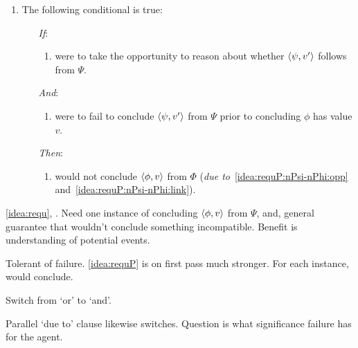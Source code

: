 \begin{note}
\begin{definition}[A \requP{0}]
\begin{itemize}
      \begin{enumerate}[label=\arabic*., ref=\named{R:\arabic*}, resume]
      \item
        \label{idea:requP:nPsi-nPhi}
        The following conditional is true:
        \begin{enumerate}
        \item[\emph{If}:]
          \begin{enumerate}[label=\alph*., ref=\named{R:2\alph*}]
          \item
            \label{idea:requP:nPsi-nPhi:opp}
            \vAgent{} were to take the opportunity to reason about whether \(\langle \psi, v' \rangle\) follows from \(\Psi\).
          \end{enumerate}
        \item[\emph{And}:]
          \begin{enumerate}[label=\alph*., ref=\named{R:2\alph*}, resume]
          \item
            \label{idea:requP:nPsi-nPhi:link}
            \vAgent{} were to fail to conclude \(\langle \psi, v' \rangle\) from \(\Psi\) prior to concluding \(\phi\) has value \(v\).
          \end{enumerate}
        \item[\emph{Then}:]
          \begin{enumerate}[label=\alph*., ref=\named{R:2\alph*}, resume]
            \label{idea:requP:nPsi-nPhi:fail}
          \item
            \vAgent{} would not conclude \(\langle \phi, v \rangle\) from \(\Phi\) (\emph{due to}~\ref{idea:requP:nPsi-nPhi:opp} and~\ref{idea:requP:nPsi-nPhi:link}).
          \end{enumerate}
        \end{enumerate}
      \end{enumerate}
    \end{itemize}
    \vspace{-\baselineskip}
  \end{definition}
\end{note}

\begin{note}
  \autoref{idea:requ}, \fc{}.
  Need one instance of concluding \(\langle \phi, v \rangle\) from \(\Psi\), and, general guarantee that wouldn't conclude something incompatible.
  Benefit is understanding of potential events.

  Tolerant of failure.
  \autoref{idea:requP} is on first pass much stronger.
  For each instance, would conclude.

  Switch from `or' to `and'.

  Parallel `due to' clause likewise switches.
  Question is what significance failure has for the agent.
\end{note}

